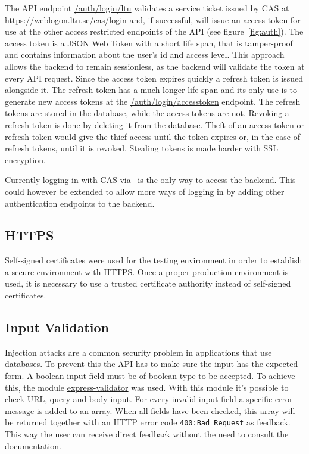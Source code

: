The API endpoint \url{/auth/login/ltu} validates a service ticket issued by CAS at \url{https://weblogon.ltu.se/cas/login} and, if successful, will issue an access token for use at the other access restricted endpoints of the API (see figure~\ref{fig:auth}). The access token is a JSON Web Token with a short life span, that is tamper-proof and contains information about the user's id and access level. This approach allows the backend to remain sessionless, as the backend will validate the token at every API request. Since the access token expires quickly a refresh token is issued alongside it. The refresh token has a much longer life span and its only use is to generate new access tokens at the \url{/auth/login/accesstoken} endpoint. The refresh tokens are stored in the database, while the access tokens are not. Revoking a refresh token is done by deleting it from the database. Theft of an access token or refresh token would give the thief access until the token expires or, in the case of refresh tokens, until it is revoked. Stealing tokens is made harder with SSL encryption.

Currently logging in with CAS via \LTU\ is the only way to access the backend. This could however be extended to allow more ways of logging in by adding other authentication endpoints to the backend.

\subsection{HTTPS} \label{https}
Self-signed certificates were used for the testing environment in order to establish a secure environment with HTTPS. Once a proper production environment is used, it is necessary to use a trusted certificate authority instead of self-signed certificates.

\subsection{Input Validation}
Injection attacks are a common security problem in applications that use databases. To prevent this the API has to make sure the input has the expected form. A boolean input field must be of boolean type to be accepted. To achieve this, the module \href{https://github.com/ctavan/express-validator}{express-validator} was used. With this module it's possible to check URL, query and body input. For every invalid input field a specific error message is added to an array. When all fields have been checked, this array will be returned together with an HTTP error code \texttt{400:\@ Bad Request} as feedback. This way the user can receive direct feedback without the need to consult the documentation.

